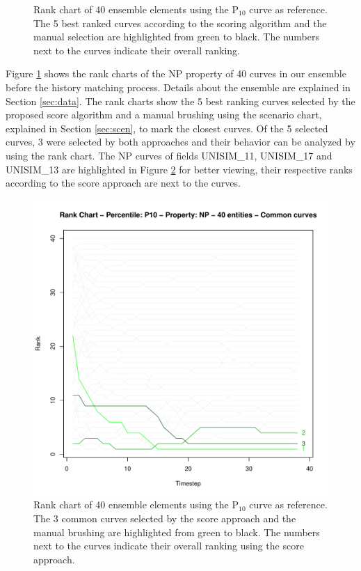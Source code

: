 \documentclass[final,5p,times,twocolumn]{elsarticle}
\begin{document}
\begin{figure}[H]
  \caption{Rank chart of 40 ensemble elements using the P$_{10}$ curve as reference. The 5 best ranked curves according to the scoring algorithm and the manual selection are highlighted from green to black. The numbers next to the curves indicate their overall ranking.}
  \label{fig:rank-score-brush}
\end{figure}

Figure \ref{fig:rank-score-brush} shows the rank charts of the NP property of 40 curves in our ensemble before the history matching process. Details about the ensemble are explained in Section \ref{sec:data}. The rank charts show the 5 best ranking curves selected by the proposed score algorithm and a manual brushing using the scenario chart, explained in Section \ref{sec:scen}, to mark the closest curves. Of the 5 selected curves, 3 were selected by both approaches and their behavior can be analyzed by using the rank chart. The NP curves of fields UNISIM\_11, UNISIM\_17 and UNISIM\_13 are highlighted in Figure \ref{fig:rank-highlight} for better viewing, their respective ranks according to the score approach are next to the curves.

\begin{figure}[H]
  \includegraphics[width=\columnwidth]{rank-common-40.pdf}
  \caption{Rank chart of 40 ensemble elements using the P$_{10}$ curve as reference. The 3 common curves selected by the score approach and the manual brushing are highlighted from green to black. The numbers next to the curves indicate their overall ranking using the score approach.}
  \label{fig:rank-highlight}
\end{figure}
\end{document}
